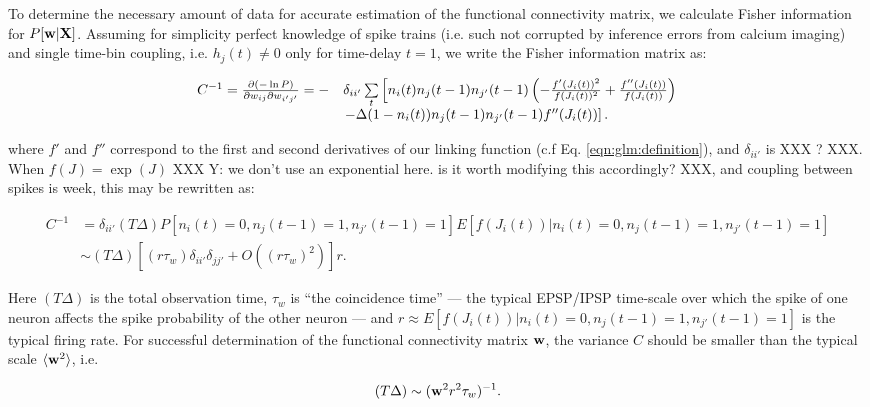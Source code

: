 To determine the necessary amount of data for accurate estimation of
the functional connectivity matrix, we calculate Fisher information
for $P[\mathbf{w}| {\bf X}]$. Assuming for simplicity perfect knowledge of spike
trains (i.e. such not corrupted by inference errors from calcium
imaging) and single time-bin coupling, i.e. $h_{j}(t)\neq 0$ only for
time-delay $t=1$, we write the Fisher information matrix as:

\begin{equation}
\begin{array}{rl}
C^{-1}=\frac{\partial (-\ln P)}{\partial \w_{ij}\partial \w_{i'j'}}
=-&\delta_{ii'}\sum\limits_t\left[
n_i(t)n_{j}(t-1)n_{j'}(t-1)\left(-\frac{f'(J_i(t))^2}{f(J_i(t))^2} +
\frac{f''(J_i(t))}{f(J_i(t))}\right) \right. \\
&\left.-\Delta (1-n_i(t))n_{j}(t-1)n_{j'}(t-1)f''(J_i(t))\right].
\end{array}
\end{equation}

 where $f'$ and $f''$ correspond to the first and second derivatives of our linking function (c.f Eq. \ref{eqn:glm:definition}), and $\delta_{ii'}$ is XXX ? XXX.  When $f(J)=\exp(J)$ XXX Y: we don't use an exponential here.  is it worth modifying this accordingly? XXX, and coupling between spikes is week, this may be rewritten as:

\begin{equation}\label{eqn:fisher}
\begin{array}{rl}
C^{-1}
&=\delta_{ii'} (T\Delta) P[n_i(t)=0, n_j(t-1)=1, n_{j'}(t-1)=1]E[f(J_i(t))|n_i(t)=0, n_j(t-1)=1, n_{j'}(t-1)=1] \\
&\sim (T\Delta)\left[(r \tau_w)\delta_{ii'}\delta_{jj'}+O((r \tau_w)^2)\right]r.
\end{array}
\end{equation}

Here $(T\Delta)$ is the total observation time, $ \tau_w$ is ``the coincidence time'' --- the typical EPSP/IPSP time-scale over which the spike of one neuron affects the spike probability of the other neuron --- and $r \approx E[f(J_i(t))|n_i(t)=0, n_j(t-1)=1, n_{j'}(t-1)=1]$ is the typical firing rate.  For successful determination of the functional connectivity matrix $\mathbf{w}$, the variance $C$ should be smaller than the typical scale $\langle \mathbf{w}^2\rangle$, i.e.

\begin{equation}
(T\Delta) \sim (\bw^2 r^2  \tau_w)^{-1}.
\end{equation}

